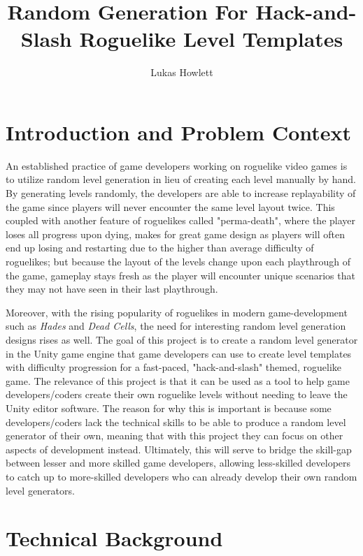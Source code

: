 \documentclass[10pt,twocolumn]{article}
\title{Random Generation For Hack-and-Slash Roguelike Level Templates}
\author{Lukas Howlett}
\affiliation{Occidental College}
\begin{document}
\maketitle

\section{Introduction and Problem Context}

An established practice of game developers working on roguelike video games is to utilize random level generation in lieu of creating each level manually by hand. By generating levels randomly, the developers are able to increase replayability of the game since players will never encounter the same level layout twice. This coupled with another feature of roguelikes called "perma-death", where the player loses all progress upon dying, makes for great game design as players will often end up losing and restarting due to the higher than average difficulty of roguelikes; but because the layout of the levels change upon each playthrough of the game, gameplay stays fresh as the player will encounter unique scenarios that they may not have seen in their last playthrough.

Moreover, with the rising popularity of roguelikes in modern game-development such as \textit{Hades}\cite{hades} and \textit{Dead Cells}\cite{deadcells}, the need for interesting random level generation designs rises as well. The goal of this project is to create a random level generator in the Unity game engine that game developers can use to create level templates with difficulty progression for a fast-paced, "hack-and-slash" themed, roguelike game. The relevance of this project is that it can be used as a tool to help game developers/coders create their own roguelike levels without needing to leave the Unity editor software. The reason for why this is important is because some developers/coders lack the technical skills to be able to produce a random level generator of their own, meaning that with this project they can focus on other aspects of development instead. Ultimately, this will serve to bridge the skill-gap between lesser and more skilled game developers, allowing less-skilled developers to catch up to more-skilled developers who can already develop their own random level generators. 

\section{Technical Background}
\end{document}
